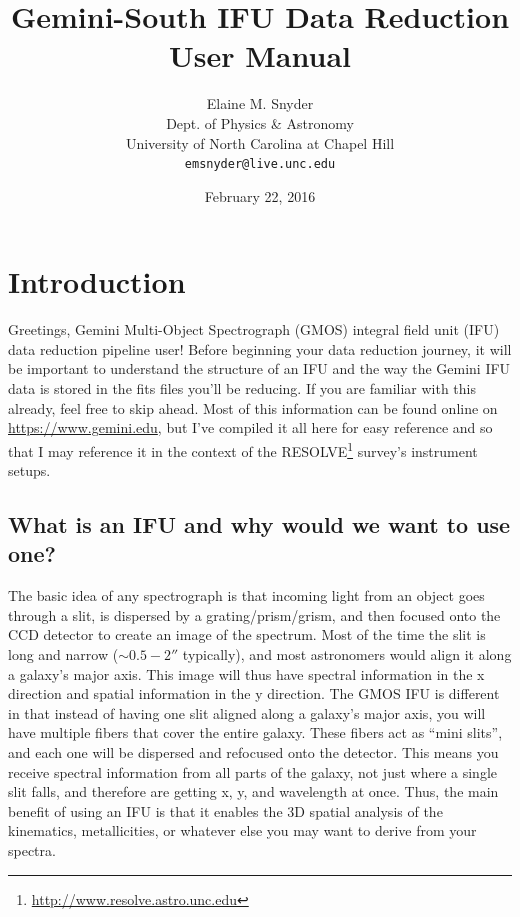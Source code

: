 \documentclass[12pt]{report}
\begin{document}
\title{Gemini-South IFU Data Reduction User Manual}
\author{Elaine M. Snyder\\
Dept. of Physics \& Astronomy\\
University of North Carolina at Chapel Hill \\
\texttt{emsnyder@live.unc.edu}}
\date{February 22, 2016}
\maketitle

\hypersetup{linkcolor=magenta}
\tableofcontents
\listoffigures
\begingroup
\let\clearpage\relax
\listoftables
\endgroup


\chapter{Introduction}
Greetings, Gemini Multi-Object Spectrograph (GMOS) integral field unit (IFU) data reduction pipeline user! Before beginning your data reduction journey, it will be important to understand the structure of an IFU and the way the Gemini IFU data is stored in the fits files you'll be reducing. If you are familiar with this already, feel free to skip ahead. Most of this information can be found online on \url{https://www.gemini.edu}, but I've compiled it all here for easy reference and so that I may reference it in the context of the RESOLVE\footnote{\url{http://www.resolve.astro.unc.edu}} survey's instrument setups.

\section{What is an IFU and why would we want to use one?}
\label{ifu}
The basic idea of any spectrograph is that incoming light from an object goes through a slit, is dispersed by a grating/prism/grism, and then focused onto the CCD detector to create an image of the spectrum. Most of the time the slit is long and narrow ($\sim0.5-2''$ typically), and most astronomers would align it along a galaxy's major axis. This image will thus have spectral information in the x direction and spatial information in the y direction. The GMOS IFU is different in that instead of having one slit aligned along a galaxy's major axis, you will have multiple fibers that cover the entire galaxy. These fibers act as ``mini slits'', and each one will be dispersed and refocused onto the detector. This means you receive spectral information from all parts of the galaxy, not just where a single slit falls, and therefore are getting x, y, and wavelength at once. Thus, the main benefit of using an IFU is that it enables the 3D spatial analysis of the kinematics, metallicities, or whatever else you may want to derive from your spectra.
\end{document}
